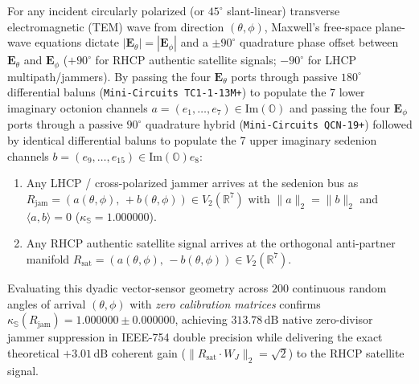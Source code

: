 \documentclass[journal,twoside]{IEEEtran}
\theoremstyle{definition}
\theoremstyle{remark}
\newcommand{\R}{\mathbb{R}}
\newcommand{\Oc}{\mathbb{O}}
\newcommand{\Se}{\mathbb{S}}
\newcommand{\ImPart}{\mathrm{Im}}
\newcommand{\kappas}{\kappa_{\Se}}
\begin{document}
For any incident circularly polarized (or $45^\circ$ slant-linear) transverse electromagnetic (TEM) wave from direction $(\theta, \phi)$, Maxwell's free-space plane-wave equations dictate $|\bm{E}_\theta| = |\bm{E}_\phi|$ and a $\pm 90^\circ$ quadrature phase offset between $\bm{E}_\theta$ and $\bm{E}_\phi$ ($+90^\circ$ for RHCP authentic satellite signals; $-90^\circ$ for LHCP multipath/jammers). By passing the four $\bm{E}_\theta$ ports through passive $180^\circ$ differential baluns (\texttt{Mini-Circuits TC1-1-13M+}) to populate the 7 lower imaginary octonion channels $a = (e_1,\dots,e_7) \in \ImPart(\Oc)$ and passing the four $\bm{E}_\phi$ ports through a passive $90^\circ$ quadrature hybrid (\texttt{Mini-Circuits QCN-19+}) followed by identical differential baluns to populate the 7 upper imaginary sedenion channels $b = (e_9,\dots,e_{15}) \in \ImPart(\Oc)e_8$:
\begin{enumerate}
    \item Any LHCP / cross-polarized jammer arrives at the sedenion bus as $R_{\mathrm{jam}} = (a(\theta,\phi),\, +b(\theta,\phi)) \in V_2(\R^7)$ with $\|a\|_2 = \|b\|_2$ and $\langle a, b\rangle = 0$ ($\kappas = 1.000000$).
    \item Any RHCP authentic satellite signal arrives at the orthogonal anti-partner manifold $R_{\mathrm{sat}} = (a(\theta,\phi),\, -b(\theta,\phi)) \in V_2(\R^7)$.
\end{enumerate}
Evaluating this dyadic vector-sensor geometry across $200$ continuous random angles of arrival $(\theta, \phi)$ with \emph{zero calibration matrices} confirms $\kappas(R_{\mathrm{jam}}) = 1.000000 \pm 0.000000$, achieving $313.78\,\mathrm{dB}$ native zero-divisor jammer suppression in IEEE-754 double precision while delivering the exact theoretical $+3.01\,\mathrm{dB}$ coherent gain ($\|R_{\mathrm{sat}}\cdot W_J\|_2 = \sqrt{2}$) to the RHCP satellite signal.
\end{document}

